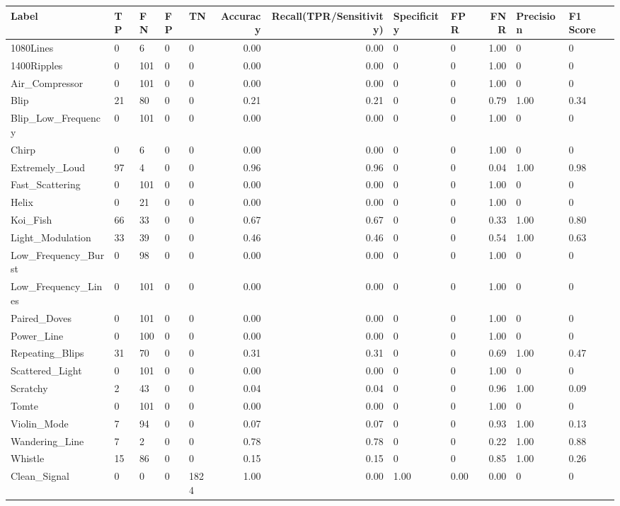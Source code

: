 \begin{tabular}{lllllrrllrll}
\toprule
Label & TP & FN & FP & TN & Accuracy & Recall(TPR/Sensitivity) & Specificity & FPR & FNR & Precision & F1 Score \\
\midrule
1080Lines & 0 & 6 & 0 & 0 & 0.00 & 0.00 & 0 & 0 & 1.00 & 0 & 0 \\
1400Ripples & 0 & 101 & 0 & 0 & 0.00 & 0.00 & 0 & 0 & 1.00 & 0 & 0 \\
Air\_Compressor & 0 & 101 & 0 & 0 & 0.00 & 0.00 & 0 & 0 & 1.00 & 0 & 0 \\
Blip & 21 & 80 & 0 & 0 & 0.21 & 0.21 & 0 & 0 & 0.79 & 1.00 & 0.34 \\
Blip\_Low\_Frequency & 0 & 101 & 0 & 0 & 0.00 & 0.00 & 0 & 0 & 1.00 & 0 & 0 \\
Chirp & 0 & 6 & 0 & 0 & 0.00 & 0.00 & 0 & 0 & 1.00 & 0 & 0 \\
Extremely\_Loud & 97 & 4 & 0 & 0 & 0.96 & 0.96 & 0 & 0 & 0.04 & 1.00 & 0.98 \\
Fast\_Scattering & 0 & 101 & 0 & 0 & 0.00 & 0.00 & 0 & 0 & 1.00 & 0 & 0 \\
Helix & 0 & 21 & 0 & 0 & 0.00 & 0.00 & 0 & 0 & 1.00 & 0 & 0 \\
Koi\_Fish & 66 & 33 & 0 & 0 & 0.67 & 0.67 & 0 & 0 & 0.33 & 1.00 & 0.80 \\
Light\_Modulation & 33 & 39 & 0 & 0 & 0.46 & 0.46 & 0 & 0 & 0.54 & 1.00 & 0.63 \\
Low\_Frequency\_Burst & 0 & 98 & 0 & 0 & 0.00 & 0.00 & 0 & 0 & 1.00 & 0 & 0 \\
Low\_Frequency\_Lines & 0 & 101 & 0 & 0 & 0.00 & 0.00 & 0 & 0 & 1.00 & 0 & 0 \\
Paired\_Doves & 0 & 101 & 0 & 0 & 0.00 & 0.00 & 0 & 0 & 1.00 & 0 & 0 \\
Power\_Line & 0 & 100 & 0 & 0 & 0.00 & 0.00 & 0 & 0 & 1.00 & 0 & 0 \\
Repeating\_Blips & 31 & 70 & 0 & 0 & 0.31 & 0.31 & 0 & 0 & 0.69 & 1.00 & 0.47 \\
Scattered\_Light & 0 & 101 & 0 & 0 & 0.00 & 0.00 & 0 & 0 & 1.00 & 0 & 0 \\
Scratchy & 2 & 43 & 0 & 0 & 0.04 & 0.04 & 0 & 0 & 0.96 & 1.00 & 0.09 \\
Tomte & 0 & 101 & 0 & 0 & 0.00 & 0.00 & 0 & 0 & 1.00 & 0 & 0 \\
Violin\_Mode & 7 & 94 & 0 & 0 & 0.07 & 0.07 & 0 & 0 & 0.93 & 1.00 & 0.13 \\
Wandering\_Line & 7 & 2 & 0 & 0 & 0.78 & 0.78 & 0 & 0 & 0.22 & 1.00 & 0.88 \\
Whistle & 15 & 86 & 0 & 0 & 0.15 & 0.15 & 0 & 0 & 0.85 & 1.00 & 0.26 \\
Clean\_Signal & 0 & 0 & 0 & 1824 & 1.00 & 0.00 & 1.00 & 0.00 & 0.00 & 0 & 0 \\
\bottomrule
\end{tabular}
